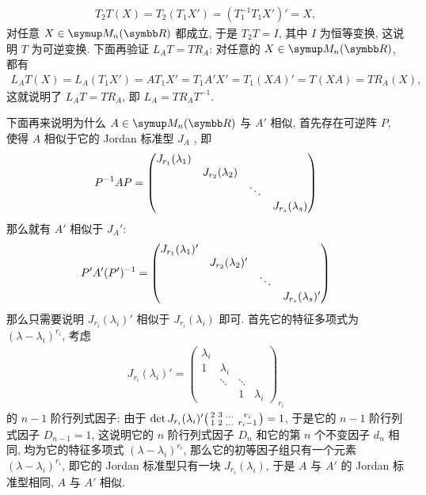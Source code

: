 \documentclass{ctexart}
\begin{document}
\begin{exercise}[resume=exer]
\begin{answer}
            \begin{align*}
                T_{2}T(X) = T_{2}(T_{1}X') = (T_{1}^{-1}T_{1}X')' = X,
            \end{align*}
            对任意 $ X \in \MM $ 都成立, 于是 $ T_{2}T = I $, 其中 $ I $ 为恒等变换, 这说明 $ T $ 为可逆变换. 下面再验证 $ L_{A}T = TR_{A} $: 对任意的 $ X \in \MM $, 都有
            \begin{align*}
                L_{A}T(X) = L_{A}(T_{1}X') = AT_{1}X' = T_{1}A'X' = T_{1}(XA)' = T(XA) = TR_{A}(X),
            \end{align*} 
            这就说明了 $ L_{A}T = TR_{A} $, 即 $ L_{A} = TR_{A}T^{-1} $.

            下面再来说明为什么 $ A \in \MM $ 与 $ A' $ 相似, 首先存在可逆阵 $ P $, 使得 $ A $ 相似于它的 Jordan 标准型 $ J_{A} $ , 即
            \begin{align*}
                P^{-1}AP = \mqty(\dmat{J_{r_{1}}(\lambda_{1}), J_{r_{2}}(\lambda_{2}), \ddots, J_{r_{s}}(\lambda_{s})})
            \end{align*}
            那么就有 $ A' $ 相似于 $ J_{A}' $: 
            \begin{align*}
                P'A'(P')^{-1} = \mqty(\dmat{J_{r_{1}}(\lambda_{1})', J_{r_{2}}(\lambda_{2})', \ddots, J_{r_{s}}(\lambda_{s})'})
            \end{align*}
            那么只需要说明 $ J_{r_{i}}(\lambda_{i})' $ 相似于 $ J_{r_{i}}(\lambda_{i}) $ 即可. 首先它的特征多项式为 $ (\lambda - \lambda_{i})^{r_{i}} $, 考虑
            \begin{align*}
                J_{r_{i}}(\lambda_{i})' = \begin{pmatrix}
                    \lambda_{i} & & & \\
                    1 & \lambda_{i} & & \\
                    &  \ddots & \ddots & \\
                    & & 1 & \lambda_{i}
                \end{pmatrix}_{r_{i}}
            \end{align*}
            的 $ n-1 $ 阶行列式因子: 由于 $ \det J_{r_{i}}(\lambda_{i})'\smqty(2 & 3 & \dots & r_{i} \\ 1 & 2 & \dots & r_{i}-1) = 1 $, 于是它的 $ n - 1 $ 阶行列式因子 $ D_{n-1} = 1 $, 这说明它的 $ n $ 阶行列式因子 $ D_{n} $ 和它的第 $ n $ 个不变因子 $ d_{n} $ 相同, 均为它的特征多项式 $ (\lambda - \lambda_{i})^{r_{i}} $, 那么它的初等因子组只有一个元素 $ (\lambda - \lambda_{i})^{r_{i}} $, 即它的 Jordan 标准型只有一块 $ J_{r_{i}}(\lambda_{i}) $, 于是 $ A $ 与 $ A' $ 的 Jordan 标准型相同, $ A $ 与 $ A' $ 相似. 

\end{answer}
\end{exercise}
\end{document}
